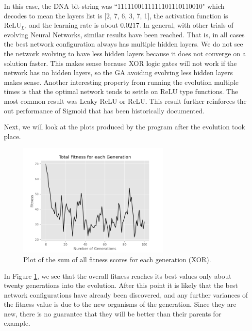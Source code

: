 \documentclass[12pt]{report}
\begin{document}
 In this case, the DNA bit-string was ``1111100111111101110110010" which decodes to mean the layers list is [2, 7, 6, 3, 7, 1], the activation function is $\text{ReLU}_L$, and the learning rate is about 0.0217. In general, with other trials of evolving Neural Networks, similar results have been reached. That is, in all cases the best network configuration always has multiple hidden layers. We do not see the network evolving to have less hidden layers because it does not converge on a solution faster. This makes sense because XOR logic gates will not work if the network has no hidden layers, so the GA avoiding evolving less hidden layers makes sense. Another interesting property from running the evolution multiple times is that the optimal network tends to settle on ReLU type functions. The most common result was Leaky ReLU or ReLU. This result further reinforces the out performance of Sigmoid that has been historically documented.

Next, we will look at the plots produced by the program after the evolution took place.
 \begin{figure}[hbt!]
    \centering
    \includegraphics[width=3in]{figures/11.png}
    \caption{Plot of the sum of all fitness scores for each generation (XOR).}
    \label{xortotal}
\end{figure}
In Figure \ref{xortotal}, we see that the overall fitness reaches its best values only about twenty generations into the evolution. After this point it is likely that the best network configurations have already been discovered, and any further variances of the fitness value is due to the new organisms of the generation. Since they are new, there is no guarantee that they will be better than their parents for example.
\end{document}
